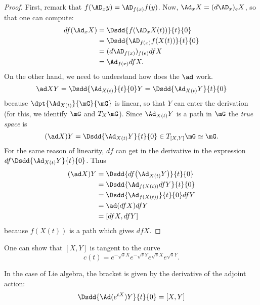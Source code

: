 \begin{proof}
First, remark that $f(\AD_xy)=\AD_{f(x)}f(y)$. Now, $\Ad_x X=(d\AD_x)_eX$, so that one can compute:
\begin{equation}
\begin{split}
   df(\Ad_xX)&=\Dsdd{f(\AD_xX(t))}{t}{0}\\
             &=\Dsdd{   \AD_{f(x)}f(X(t))  }{t}{0}\\
	     &=(d\AD_{f(x)})_{f(e)}df X\\
	     &=\Ad_{f(x)}df X.
\end{split}
\end{equation}
On the other hand, we need to understand how does the $\ad$ work.
\[
  \ad XY=\Dsdd{\Ad_{X(t)}}{t}{0}Y=\Dsdd{\Ad_{X(t)}Y}{t}{0}
\]
because $\dpt{\Ad_{X(t)}}{\mG}{\mG}$ is linear, so that $Y$ can enter the derivation (for this, we identify $\mG$ and $T_X\mG$). Since $\Ad_{X(t)}Y$ is a path in $\mG$ the \emph{true space} is
\[   
(\ad X)Y=\Dsdd{ \Ad_{X(t)}Y }{t}{0}\in T_{[X,Y]}\mG\simeq\mG.
\]
For the same reason of linearity, $df$ can get in the derivative in the expression $df\Dsdd{  \Ad_{X(t)}Y  }{t}{0}$. Thus
\begin{equation}
\begin{split}
(\ad X)Y&=\Dsdd{  df\big(\Ad_{X(t)}Y\big)  }{t}{0}\\
        &=\Dsdd{  \Ad_{ f(X(t)) }df Y  }{t}{0}\\
	&=\Dsdd{ \Ad_{f(X(t))} }{t}{0}df Y\\
	&=\ad(dfX)df Y\\
	&=[dfX,df Y]
\end{split}
\end{equation}
because $f(X(t))$ is a path which gives $df X$.

\end{proof}

One can show that $[X,Y]$ is tangent to the curve
\begin{equation}
  c(t)=e^{-\sqrt{s}X}e^{-\sqrt{s}Y}e^{\sqrt{s}X}e^{\sqrt{s}Y}.
\end{equation}

\begin{lemma}
	In the case of Lie algebra, the bracket is given by the derivative of the adjoint action:
	\begin{equation}
		\Dsdd{ \Ad( e^{tX})Y }{t}{0}=[X,Y]
	\end{equation}
\end{lemma}

